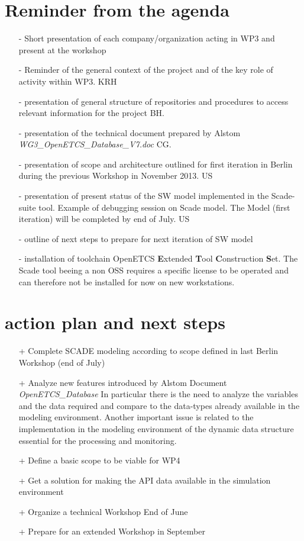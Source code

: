 \documentclass{template/openetcs_report}
\begin{document}
\section{Reminder from the agenda}
\begin{itemize}
\item[-]Short presentation of each company/organization acting in WP3 and present at the workshop
\item[-]Reminder of the general context of the project and of the key role of activity within WP3. KRH
\item[-]presentation of general structure of repositories and procedures to access relevant information for the project BH.
\item[-]presentation of the technical document prepared by Alstom \emph{WG3\_OpenETCS\_Database\_V7.doc} CG.
\item[-]presentation of scope and architecture outlined for first iteration in Berlin during the previous Workshop in November 2013. US
\item[-]presentation of present status of the SW model implemented in the Scade-suite tool. Example of debugging session on Scade model. The Model (first iteration) will be completed by end of July. US
\item[-]outline of next steps to prepare for next iteration of SW model 
\item[-]installation of toolchain OpenETCS {\bf E}xtended {\bf T}ool {\bf C}onstruction {\bf S}et. The Scade tool beeing a non OSS requires a specific license to be operated and can therefore not be installed for now on new workstations.
\end{itemize}
\section{action plan and next steps}
\begin{itemize}
\item[+] Complete SCADE modeling according to scope defined in last Berlin Workshop (end of July)
\item[+]{Analyze new features introduced by Alstom Document \emph{OpenETCS\_Database}
In particular there is the need to analyze the variables and the data required and compare to the data-types already available in the modeling environment. Another important issue is related to the implementation in the modeling environment of the dynamic data structure essential for the processing and monitoring. }
\item[+] Define a basic scope to be viable for WP4
\item[+] Get a solution for making the API data available in the simulation environment
\item[+] Organize a technical Workshop End of June
\item[+] Prepare for an extended Workshop in September
\end{itemize}
\end{document}
